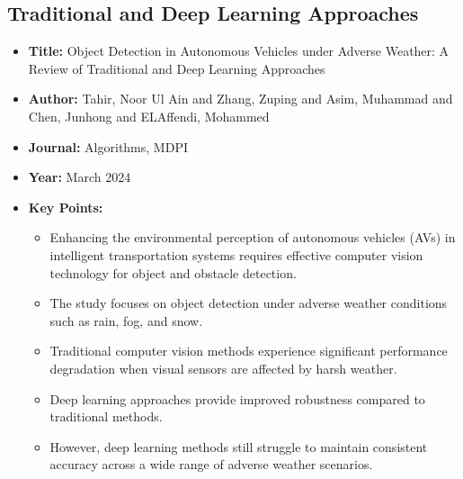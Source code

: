 \subsection{Traditional and Deep Learning Approaches}
\begin{itemize}
    \item \textbf{Title:} Object Detection in Autonomous Vehicles under Adverse Weather: A Review of Traditional and Deep Learning Approaches \cite{tahir2024object}
    \item \textbf{Author:} Tahir, Noor Ul Ain and Zhang, Zuping and Asim, Muhammad and Chen, Junhong and ELAffendi, Mohammed
    \item \textbf{Journal:} Algorithms, MDPI
    \item \textbf{Year:} March 2024
    \item \textbf{Key Points:}
    \begin{itemize}
        \item Enhancing the environmental perception of autonomous vehicles (AVs) in intelligent transportation systems requires effective computer vision technology for object and obstacle detection.
        \item The study focuses on object detection under adverse weather conditions such as rain, fog, and snow.
        \item Traditional computer vision methods experience significant performance degradation when visual sensors are affected by harsh weather.
        \item Deep learning approaches provide improved robustness compared to traditional methods.
        \item However, deep learning methods still struggle to maintain consistent accuracy across a wide range of adverse weather scenarios.
    \end{itemize}
\end{itemize}

